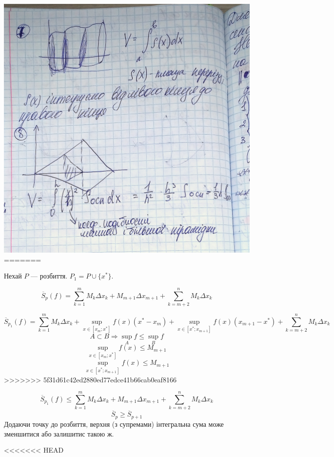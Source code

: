 \documentclass[12pt]{report}
\begin{document}
\includegraphics[scale = 0.2]{image5.jpg}
=======
\vspace{5 mm}

Нехай $P$ --- розбиття. $P_1 = P \cup \{ x^{*}\}$.

$$\overline S_p(f) = \sum_{k = 1}^m M_{k} \Delta x_k + M_{m+1}\Delta x_{m+1} + \sum_{k = m+2}^n M_k \Delta x_k$$

$$\overline S_{p_1}(f) = \sum_{k = 1}^m M_{k} \Delta x_k + \sup_{x \in [x_{m}; x^{*}]} f(x) (x^* - x_m) + \sup_{x \in [x^{*}; x_{m+1}]} f(x) (x_{m+1} - x^*) + \sum_{k = m+2}^n M_k \Delta x_k$$
$$A \subset B \Longrightarrow \sup_{A} f \leq \sup_{B} f$$
$$\sup_{x \in [x_{m}; x^{*}]} f(x) \leq M_{m+1}$$
$$\sup_{x \in [x^{*}; x_{m+1}]} f(x) \leq M_{m+1}$$
>>>>>>> 5f31d61c42ed2880ed77edce41b66cab0eaf8166

$$\overline S_{p_1}(f) \leq \sum_{k = 1}^m M_{k} \Delta x_k + M_{m+1}\Delta x_{m+1} + \sum_{k = m+2}^n M_k \Delta x_k$$
$$\overline S_p \geq \overline S_{p+1}$$
Додаючи точку до розбиття, верхня (з супремами) інтегральна сума може зменшитися або залишитис такою ж.

<<<<<<< HEAD
\end{document}
